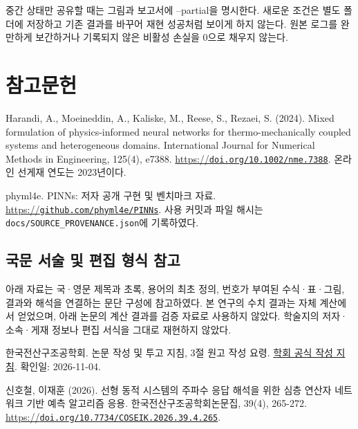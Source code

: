 \documentclass[10pt,a4paper]{article}
\begin{document}
중간 상태만 공유할 때는 그림과 보고서에 --partial을 명시한다. 새로운 조건은 별도 폴더에 저장하고 기존 결과를 바꾸어 재현 성공처럼 보이게 하지 않는다. 원본 로그를 완만하게 보간하거나 기록되지 않은 비활성 손실을 0으로 채우지 않는다.\par

\clearpage

\section{참고문헌}

{\small\color{muted} Harandi, A., Moeineddin, A., Kaliske, M., Reese, S., Rezaei, S. (2024). Mixed formulation of physics-informed neural networks for thermo-mechanically coupled systems and heterogeneous domains. International Journal for Numerical Methods in Engineering, 125(4), e7388. \href{https://doi.org/10.1002/nme.7388}{https://\nolinkurl{doi.org/10.1002/nme.7388}}. 온라인 선게재 연도는 2023년이다.\par}

{\small\color{muted} phyml4e. PINNs: 저자 공개 구현 및 벤치마크 자료. \href{https://github.com/phyml4e/PINNs}{https://\nolinkurl{github.com/phyml4e/PINNs}}. 사용 커밋과 파일 해시는 \nolinkurl{docs/SOURCE_PROVENANCE.json}에 기록하였다.\par}

\subsection{국문 서술 및 편집 형식 참고}

{\small\color{muted} 아래 자료는 국·영문 제목과 초록, 용어의 최초 정의, 번호가 부여된 수식·표·그림, 결과와 해석을 연결하는 문단 구성에 참고하였다. 본 연구의 수치 결과는 자체 계산에서 얻었으며, 아래 논문의 계산 결과를 검증 자료로 사용하지 않았다. 학술지의 저자·소속·게재 정보나 편집 서식을 그대로 재현하지 않았다.\par}

{\small\color{muted} 한국전산구조공학회. 논문 작성 및 투고 지침, 3절 원고 작성 요령. \href{https://www.jcoseik.or.kr/journal-information/instructions-for-authors/}{학회 공식 작성 지침}. 확인일: 2026-11-04.\par}

{\small\color{muted} 신호철, 이재훈 (2026). 선형 동적 시스템의 주파수 응답 해석을 위한 심층 연산자 네트워크 기반 예측 알고리즘 응용. 한국전산구조공학회논문집, 39(4), 265-272. \href{https://doi.org/10.7734/COSEIK.2026.39.4.265}{https://\nolinkurl{doi.org/10.7734/COSEIK.2026.39.4.265}}.\par}
\end{document}
